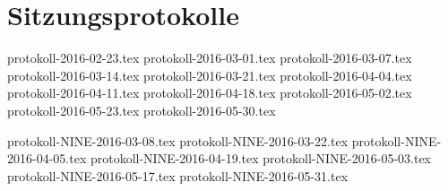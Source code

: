 \chapter{Sitzungsprotokolle}
\glsresetall

{protokoll-2016-02-23.tex}
\clearpage
{protokoll-2016-03-01.tex}
\clearpage
{protokoll-2016-03-07.tex}
\clearpage
{protokoll-2016-03-14.tex}
\clearpage
{protokoll-2016-03-21.tex}
\clearpage
{protokoll-2016-04-04.tex}
\clearpage
{protokoll-2016-04-11.tex}
\clearpage
{protokoll-2016-04-18.tex}
\clearpage
{protokoll-2016-05-02.tex}
\clearpage
{protokoll-2016-05-23.tex}
\clearpage
{protokoll-2016-05-30.tex}

\clearpage
{protokoll-NINE-2016-03-08.tex}
\clearpage
{protokoll-NINE-2016-03-22.tex}
\clearpage
{protokoll-NINE-2016-04-05.tex}
\clearpage
{protokoll-NINE-2016-04-19.tex}
\clearpage
{protokoll-NINE-2016-05-03.tex}
\clearpage
{protokoll-NINE-2016-05-17.tex}
\clearpage
{protokoll-NINE-2016-05-31.tex}